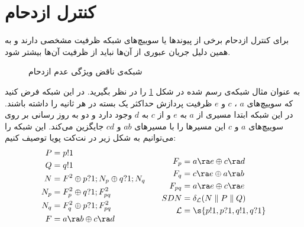 \section{کنترل ازدحام}
برای کنترل ازدحام
برخی از پیوند‌ها یا سوییچ‌های شبکه ظرفیت مشخصی دارند و به همین دلیل جریان
عبوری از آن‌ها نباید از ظرفیت آن‌ها بیشتر شود.

\begin{figure}
    \centering
    \caption{ 
        شبکه‌ی ناقض ویژگی عدم ازدحام
    }
    \label{fig:congestion}
\end{figure}
به عنوان مثال شبکه‌ی رسم شده در شکل
\ref{fig:congestion}
را در نظر بگیرید.
در این شبکه فرض کنید که سوییچ‌های
$a$
،
$c$
و
$e$
ظرفیت پردازش حداکثر یک بسته در هر ثانیه را داشته باشند.
در این شبکه ابتدا مسیری از
$a$
به
$e$
و از
$c$
به
$d$
وجود دارد و دو به روز رسانی بر روی سوییچ‌های
$a$
و
$c$
این مسیر‌ها را با مسیر‌های
$ab$
و
$cd$
جایگزین می‌کند.
این شبکه را می‌توانیم به شکل زیر در نت‌کت پویا توصیف کنیم:
\begin{equation*}
    \begin{aligned}[c]
        P   & = p!1                               \\
        Q   & = q!1                               \\
        N   & = F^2 \oplus p?1;N_p \oplus q?1;N_q \\
        N_p & = F_p^2 \oplus q?1;F_{pq}^2         \\
        N_q & = F_q^2 \oplus p?1;F_{pq}^2         \\
        F   & = a\ra b \oplus c\ra d                      \\
    \end{aligned}
    \qquad
    \begin{aligned}[c]
        F_p         & = a\ra e \oplus c\ra d         \\
        F_q         & = c\ra e \oplus a\ra b         \\
        F_{pq}      & = a\ra e \oplus c\ra e         \\
        SDN         & = \delta_{\mathcal{L}}
        (N \parallel P \parallel Q)          \\
        \mathcal{L} & = \s{p!1,p?1,q!1,q?1}
    \end{aligned}
\end{equation*}

